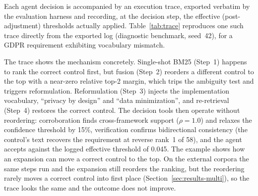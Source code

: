 \documentclass[a4paper,fleqn]{cas-sc}
\begin{document}
Each agent decision is accompanied by an execution trace, exported verbatim by the evaluation harness and recording, at the decision step, the effective (post-adjustment) thresholds actually applied.
Table~\ref{tab:trace} reproduces one such trace directly from the exported log (diagnostic benchmark, seed~42), for a GDPR requirement exhibiting vocabulary mismatch.

\begin{table}[htbp]
\caption{Example agent trace, generated directly from the exported log: GDPR Art.~25 (data protection by design and by default), correctly mapped to a privacy-by-design control. Confidence values in Steps~2--4 are fused RRF scores; the reformulation trigger and the effective threshold are logged as shown.}
\label{tab:trace}
\centering
\setlength{\tabcolsep}{3pt}
\small
{}
\end{table}

The trace shows the mechanism concretely.
Single-shot BM25 (Step~1) happens to rank the correct control first, but fusion (Step~2) reorders a different control to the top with a near-zero relative top-2 margin, which trips the ambiguity test and triggers reformulation.
Reformulation (Step~3) injects the implementation vocabulary, ``privacy by design'' and ``data minimization'', and re-retrieval (Step~4) restores the correct control.
The decision tools then operate without reordering: corroboration finds cross-framework support ($\rho=1.0$) and relaxes the confidence threshold by 15\%, verification confirms bidirectional consistency (the control's text recovers the requirement at reverse rank~1 of 58), and the agent accepts against the logged effective threshold of 0.045.
The example shows how an expansion can move a correct control to the top. On the external corpora the same steps run and the expansion still reorders the ranking, but the reordering rarely moves a correct control into first place (Section~\ref{sec:results-multi}), so the trace looks the same and the outcome does not improve.
\end{document}
